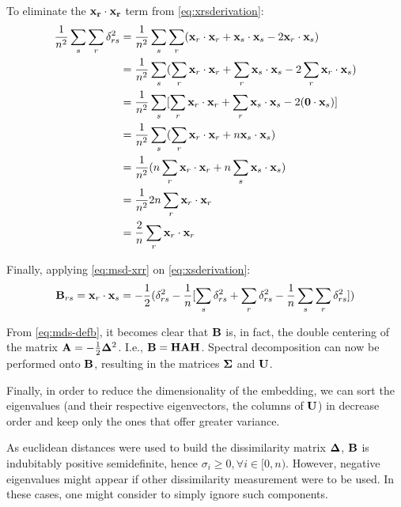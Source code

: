 To eliminate the $\mathbf{x_r\cdot x_r}$ term from \ref{eq:xrsderivation}:
\begin{align}
\label{eq:msd-xrr}
\begin{split}
\frac{1}{n^2} \sum_s\sum_r\delta_{rs}^2 &= \frac{1}{n^2} \sum_s\sum_r(\mathbf{x}_r \cdot \mathbf{x}_r + \mathbf{x}_s \cdot \mathbf{x}_s -2 \mathbf{x}_r \cdot \mathbf{x}_s) \\
&= \frac{1}{n^2}\sum_s(\sum_r \mathbf{x}_r \cdot \mathbf{x}_r + \sum_r \mathbf{x}_s \cdot \mathbf{x}_s -2\sum_r \mathbf{x}_r \cdot \mathbf{x}_s) \\
&= \frac{1}{n^2}\sum_s [\sum_r \mathbf{x}_r \cdot \mathbf{x}_r + \sum_r \mathbf{x}_s \cdot \mathbf{x}_s -2( \mathbf{0} \cdot \mathbf{x}_s)]\\
&= \frac{1}{n^2}\sum_s(\sum_r \mathbf{x}_r \cdot \mathbf{x}_r + n \mathbf{x}_s\cdot \mathbf{x}_s) \\
&= \frac{1}{n^2}(n \sum_r \mathbf{x}_r \cdot \mathbf{x}_r + n \sum_s \mathbf{x}_s \cdot \mathbf{x}_s) \\
&= \frac{1}{n^2} 2n \sum_r \mathbf{x}_r\cdot \mathbf{x}_r \\
&= \frac{2}{n} \sum_r \mathbf{x}_r \cdot \mathbf{x}_r
\end{split}
\end{align}

Finally, applying \ref{eq:msd-xrr} on \ref{eq:xsderivation}:
\begin{align}
\label{eq:mds-defb}
\begin{split}
\mathbf{B}_{rs} = \mathbf{x}_r\cdot \mathbf{x}_s = -\frac{1}{2} (\delta_{rs}^2 - \frac{1}{n} [\sum_s \delta_{rs}^2 + \sum_r \delta_{rs}^2 - \frac{1}{n}\sum_s \sum_r \delta_{rs}^2])
\end{split}
\end{align}

From \ref{eq:mds-defb}, it becomes clear that $\mathbf{B}$ is, in fact, the double centering of the matrix $\mathbf{A}=-\frac{1}{2}\mathbf{\Delta}^2$. I.e., $\mathbf{B}=\mathbf{HAH}$. Spectral decomposition can now be performed onto $\mathbf{B}$, resulting in the matrices $\mathbf{\Sigma}$ and $\mathbf{U}$.

Finally, in order to reduce the dimensionality of the embedding, we can sort the eigenvalues (and their respective eigenvectors, the columns of $\mathbf{U}$) in decrease order and keep only the ones that offer greater variance.

\begin{remark}
	As euclidean distances were used to build the dissimilarity matrix $\mathbf{\Delta}$, $\mathbf{B}$ is indubitably positive semidefinite, hence $\sigma_i \ge 0, \forall i\in [0, n)$. However, negative eigenvalues might appear if other dissimilarity measurement were to be used. In these cases, one might consider to simply ignore such components.
\end{remark}

